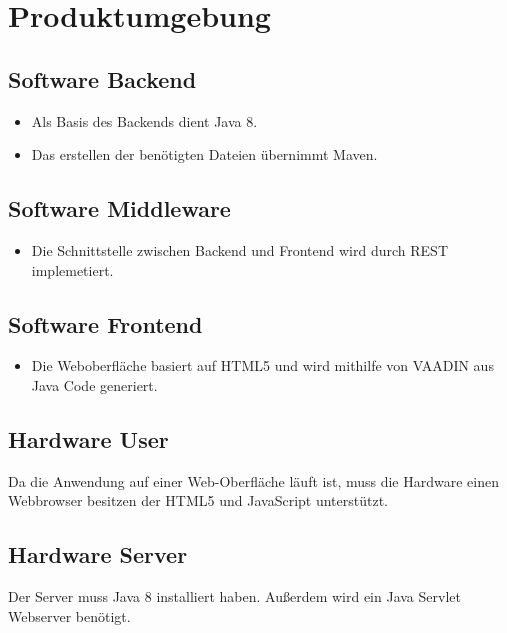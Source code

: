 \section{Produktumgebung}

\subsection{Software Backend}
\begin{itemize}
    \item Als Basis des Backends dient Java 8.
    \item Das erstellen der benötigten Dateien übernimmt Maven.
\end{itemize}

\subsection{Software Middleware}
\begin{itemize}
    \item Die Schnittstelle zwischen Backend und Frontend wird durch REST implemetiert.
\end{itemize}

\subsection{Software Frontend}
\begin{itemize}
    \item Die Weboberfläche basiert auf HTML5 und wird mithilfe von VAADIN aus Java Code generiert.
\end{itemize}

\subsection{Hardware User}
    Da die Anwendung auf einer Web-Oberfläche läuft ist, muss die Hardware einen Webbrowser besitzen der HTML5 und JavaScript unterstützt.

\subsection{Hardware Server}
    Der Server muss Java 8 installiert haben.
    Außerdem wird ein Java Servlet Webserver benötigt.

